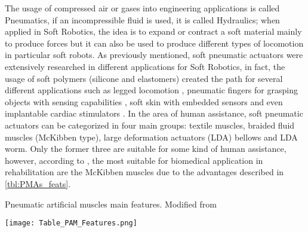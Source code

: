The usage of compressed air or gases into engineering applications is called Pneumatics, if an incompressible fluid is used, it is called Hydraulics; when applied in Soft Robotics, the idea is to expand or contract a soft material mainly to produce forces but it can also be used to produce different types of locomotion in particular soft robots. As previously mentioned, soft pneumatic actuators were extensively researched in different applications for Soft Robotics, in fact, the usage of soft polymers (silicone and elastomers) created the path for several different applications such as legged locomotion \cite{Florez2014}, pneumatic fingers for grasping objects with sensing capabilities \cite{Morrow2015}, soft skin with embedded sensors \cite{Sonar2016,Suh2014} and even implantable cardiac stimulators \cite{Roche2014}. In the area of human assistance, soft pneumatic actuators can be categorized in four main groups: textile muscles, braided fluid muscles (McKibben type), large deformation actuators (LDA) bellows and LDA worm. Only the former three are suitable for some kind of human assistance, however, according to \cite{Belforte2014}, the most suitable for biomedical application in rehabilitation are the McKibben muscles due to the advantages described in \autoref{tbl:PMAs_feats}.
\begin{table}[htp!]
  \caption{Pneumatic artificial muscles main features. Modified from \cite{Belforte2014}}
  \label{tbl:PMAs_feats}
  \centering
  \texttt{[image: Table\_PAM\_Features.png]}
\end{table}

